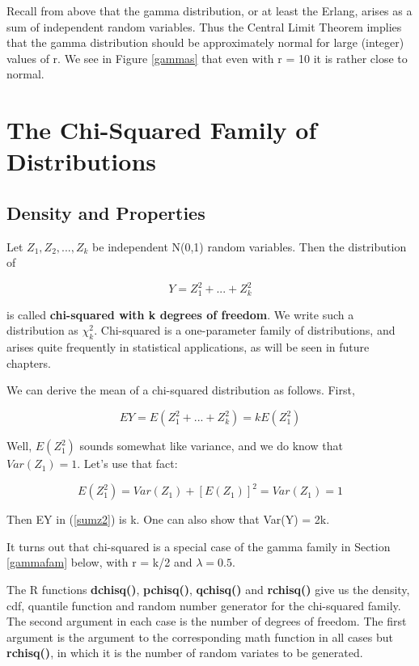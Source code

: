 Recall from above that the gamma distribution, or at least the Erlang,
arises as a sum of independent random variables.  Thus the Central Limit
Theorem implies that the gamma distribution should be approximately
normal for large (integer) values of r.  We see in Figure \ref{gammas}
that even with r = 10 it is rather close to normal.

\section{The Chi-Squared Family of Distributions}
\label{chisqfam}

\subsection{Density and Properties}

Let $Z_1, Z_2,..., Z_k$ be independent N(0,1) random variables.  Then
the distribution of 

\begin{equation}
\label{sumz2}
Y = Z_1^2+...+Z_k^2
\end{equation}

is called {\bf chi-squared with k degrees of freedom}.  We write such a
distribution as $\chi_k^2$.  Chi-squared is a one-parameter family of
distributions, and arises quite frequently in statistical applications,
as will be seen in future chapters.

We can derive the mean of a chi-squared distribution as follows.  First,

\begin{equation}
EY = E(Z_1^2+...+Z_k^2) = k E(Z_1^2)
\end{equation}

Well, $E(Z_1^2)$ sounds somewhat like variance, and we do know that
$Var(Z_1) = 1$.  Let's use that fact:

\begin{equation}
E(Z_1^2) = Var(Z_1) +  [E(Z_1)]^2 = Var(Z_1) = 1
\end{equation}

Then EY in (\ref{sumz2}) is k.  One can also show that Var(Y) = 2k.

It turns out that chi-squared is a special case of the gamma family in
Section \ref{gammafam} below, with r = k/2 and $\lambda = 0.5$.

The R functions {\bf dchisq()}, {\bf pchisq()}, {\bf qchisq()} and {\bf
rchisq()} give us the density, cdf, quantile function and random number
generator for the chi-squared family.  The second argument in each case
is the number of degrees of freedom.  The first argument is the argument
to the corresponding math function in all cases but {\bf rchisq()}, in
which it is the number of random variates to be generated.

